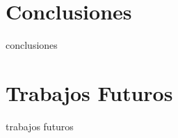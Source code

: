 \section{Conclusiones}
\label{sec:conclusiones}

conclusiones

\section{Trabajos Futuros}
\label{sec:trabajos-futuros}

trabajos futuros
